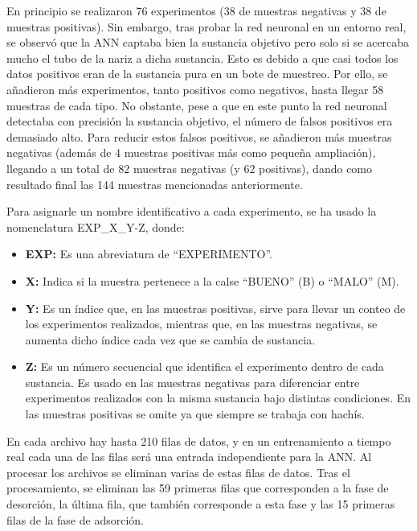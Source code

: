 En principio se realizaron 76 experimentos (38 de muestras negativas y 38 de muestras positivas). Sin embargo, tras probar la red neuronal en un entorno real, se observó que la ANN captaba bien la sustancia objetivo pero solo si se acercaba mucho el tubo de la nariz a dicha sustancia. Esto es debido a que casi todos los datos positivos eran de la sustancia pura en un bote de muestreo. Por ello, se añadieron más experimentos, tanto positivos como negativos, hasta llegar 58 muestras de cada tipo. No obstante, pese a que en este punto la red neuronal detectaba con precisión la sustancia objetivo, el número de falsos positivos era demasiado alto. Para reducir estos falsos positivos, se añadieron más muestras negativas (además de 4 muestras positivas más como pequeña ampliación), llegando a un total de 82 muestras negativas (y 62 positivas), dando como resultado final las 144 muestras mencionadas anteriormente.
\par

Para asignarle un nombre identificativo a cada experimento, se ha usado la nomenclatura EXP\_X\_Y-Z, donde:

\begin{itemize}
    \item \textbf{EXP:} Es una abreviatura de ``EXPERIMENTO''.
    \item \textbf{X:} Indica si la muestra pertenece a la calse ``BUENO'' (B) o ``MALO'' (M).
    \item \textbf{Y:} Es un índice que, en las muestras positivas, sirve para llevar un conteo de los experimentos realizados, mientras que, en las muestras negativas, se aumenta dicho índice cada vez que se cambia de sustancia.
    \item \textbf{Z:} Es un número secuencial que identifica el experimento dentro de cada sustancia. Es usado en las muestras negativas para diferenciar entre experimentos realizados con la misma sustancia bajo distintas condiciones. En las muestras positivas se omite ya que siempre se trabaja con hachís.
\end{itemize}

En cada archivo hay hasta 210 filas de datos, y en un entrenamiento a tiempo real cada una de las filas será una entrada independiente para la ANN\@. Al procesar los archivos se eliminan varias de estas filas de datos. Tras el procesamiento, se eliminan las 59 primeras filas que corresponden a la fase de desorción, la última fila, que también corresponde a esta fase y las 15 primeras filas de la fase de adsorción.
\par

